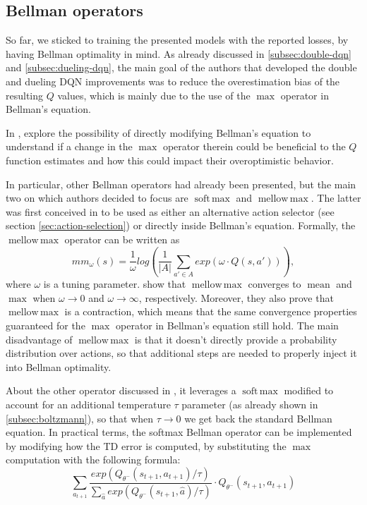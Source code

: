 \documentclass[a4paper,10pt]{report}
\DeclareMathOperator*{\softmax}{soft\,max}
\DeclareMathOperator*{\mellowmax}{mellow\,max}
\DeclareMathOperator*{\mean}{mean}
\begin{document}
\subsection{Bellman operators}\label{subsec:bellman-operators}
So far, we sticked to training the presented models with the reported losses, by having Bellman optimality in mind. As already discussed in \ref{subsec:double-dqn} and \ref{subsec:dueling-dqn}, the main goal of the authors that developed the double and dueling DQN improvements was to reduce the overestimation bias of the resulting $Q$ values, which is mainly due to the use of the $\max$ operator in Bellman's equation.

In \cite{softmax-bellman}, \citeauthor{softmax-bellman} explore the possibility of directly modifying Bellman's equation to understand if a change in the $\max$ operator therein could be beneficial to the $Q$ function estimates and how this could impact their overoptimistic behavior.

In particular, other Bellman operators had already been presented, but the main two on which authors decided to focus are $\softmax$ and $\mellowmax$. The latter was first conceived in \cite{mellowmax-bellman} to be used as either an alternative action selector (see section \ref{sec:action-selection}) or directly inside Bellman's equation. Formally, the $\mellowmax$ operator can be written as
$$
mm_\omega(s) = \frac{1}{\omega}log\left(\frac{1}{|A|} \sum_{a'\in A} exp(\omega \cdot Q(s,a'))\right),
$$ 
where $\omega$ is a tuning parameter. \citeauthor{mellowmax-bellman} show that $\mellowmax$ converges to $\mean$ and $\max$ when $\omega\rightarrow 0$ and $\omega\rightarrow \infty$, respectively. Moreover, they also prove that $\mellowmax$ is a contraction, which means that the same convergence properties guaranteed for the $\max$ operator in Bellman's equation still hold. The main disadvantage of $\mellowmax$ is that it doesn't directly provide a probability distribution over actions, so that additional steps are needed to properly inject it into Bellman optimality.

About the other operator discussed in \cite{softmax-bellman}, it leverages a $\softmax$ modified to account for an additional temperature $\tau$ parameter (as already shown in \ref{subsec:boltzmann}), so that when $\tau\rightarrow 0$ we get back the standard Bellman equation. In practical terms, the softmax Bellman operator can be implemented by modifying how the TD error is computed, by substituting the $\max$ computation with the following formula:
$$
\sum_{a_{t+1}}\frac{exp(Q_{\theta^-}(s_{t+1}, a_{t+1})/\tau)}{\sum_{\hat{a}}exp(Q_{\theta^-}(s_{t+1}, \hat{a})/\tau)}\cdot Q_{\theta^-}(s_{t+1},a_{t+1})
$$
\end{document}
